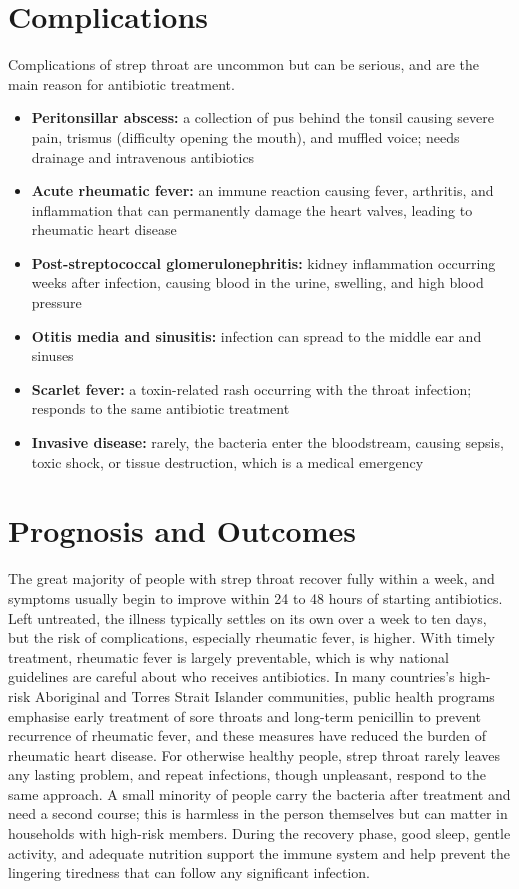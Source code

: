 \section*{Complications}
Complications of strep throat are uncommon but can be serious, and are the main reason for antibiotic treatment.

\begin{itemize}
    \item \textbf{Peritonsillar abscess:} a collection of pus behind the tonsil causing severe pain, trismus (difficulty opening the mouth), and muffled voice; needs drainage and intravenous antibiotics
    \item \textbf{Acute rheumatic fever:} an immune reaction causing fever, arthritis, and inflammation that can permanently damage the heart valves, leading to rheumatic heart disease
    \item \textbf{Post-streptococcal glomerulonephritis:} kidney inflammation occurring weeks after infection, causing blood in the urine, swelling, and high blood pressure
    \item \textbf{Otitis media and sinusitis:} infection can spread to the middle ear and sinuses
    \item \textbf{Scarlet fever:} a toxin-related rash occurring with the throat infection; responds to the same antibiotic treatment
    \item \textbf{Invasive disease:} rarely, the bacteria enter the bloodstream, causing sepsis, toxic shock, or tissue destruction, which is a medical emergency
\end{itemize}

\section*{Prognosis and Outcomes}
The great majority of people with strep throat recover fully within a week, and symptoms usually begin to improve within 24 to 48 hours of starting antibiotics. Left untreated, the illness typically settles on its own over a week to ten days, but the risk of complications, especially rheumatic fever, is higher. With timely treatment, rheumatic fever is largely preventable, which is why national guidelines are careful about who receives antibiotics. In many countries's high-risk Aboriginal and Torres Strait Islander communities, public health programs emphasise early treatment of sore throats and long-term penicillin to prevent recurrence of rheumatic fever, and these measures have reduced the burden of rheumatic heart disease. For otherwise healthy people, strep throat rarely leaves any lasting problem, and repeat infections, though unpleasant, respond to the same approach. A small minority of people carry the bacteria after treatment and need a second course; this is harmless in the person themselves but can matter in households with high-risk members. During the recovery phase, good sleep, gentle activity, and adequate nutrition support the immune system and help prevent the lingering tiredness that can follow any significant infection.

